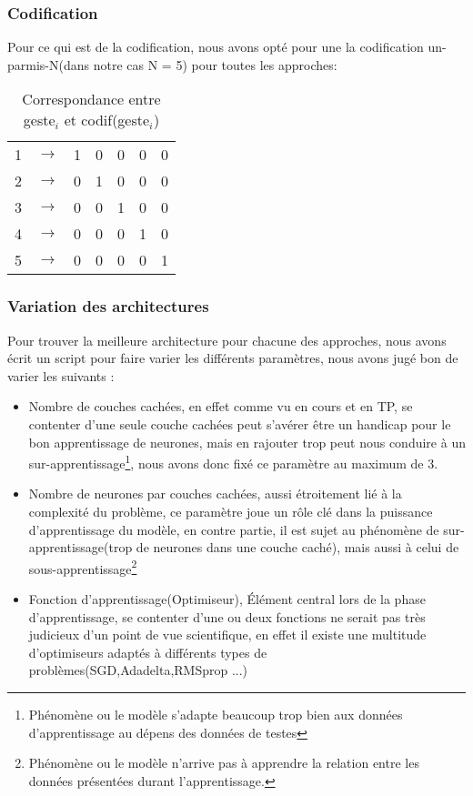 \subsubsection{Codification}
Pour ce qui est de la codification, nous avons opté pour une la codification un-parmis-N(dans notre cas N = 5) pour toutes les approches:\\
\begin{table}[H]
	\centering
	\begin{tabular}{|c|l|c|c|c|c|c|}
		\cline{1-1} \cline{3-7}
		1 & $\rightarrow$ & 1 & 0 & 0 & 0 & 0 \\ \cline{1-1} \cline{3-7} 
		2 & $\rightarrow$ & 0 & 1 & 0 & 0 & 0 \\ \cline{1-1} \cline{3-7} 
		3 & $\rightarrow$ & 0 & 0 & 1 & 0 & 0 \\ \cline{1-1} \cline{3-7} 
		4 & $\rightarrow$ & 0 & 0 & 0 & 1 & 0 \\ \cline{1-1} \cline{3-7} 
		5 & $\rightarrow$ & 0 & 0 & 0 & 0 & 1 \\ \cline{1-1} \cline{3-7} 
	\end{tabular}
	\caption{Correspondance entre geste$_i$ et codif(geste$_i$)}
	
\end{table}


\subsubsection{Variation des architectures}
Pour trouver la meilleure architecture pour chacune des approches, nous avons écrit un script pour faire varier les différents paramètres, nous avons jugé bon de varier les suivants : 
\begin{itemize}
	\item Nombre de couches cachées, en effet comme vu en cours et en TP, se contenter d'une seule couche cachées peut s'avérer être un handicap pour le bon apprentissage de neurones, mais en rajouter trop peut nous conduire à un sur-apprentissage\footnote{Phénomène ou le modèle s'adapte beaucoup trop bien aux données d'apprentissage au dépens des données de testes}, nous avons donc fixé ce paramètre au maximum de 3.
	
	\item Nombre de neurones par couches cachées, aussi étroitement lié à la complexité du problème, ce paramètre joue un rôle clé dans la puissance d'apprentissage du modèle, en contre partie, il est sujet au phénomène de sur-apprentissage(trop de neurones dans une couche caché), mais aussi à celui de sous-apprentissage\footnote{Phénomène ou le modèle n'arrive pas à apprendre la relation entre les données présentées durant l'apprentissage.}
	
	\item Fonction d'apprentissage(Optimiseur), Élément central lors de la phase d'apprentissage, se contenter d'une ou deux fonctions ne serait pas très judicieux d'un point de vue scientifique, en effet il existe une multitude d'optimiseurs adaptés à différents types de problèmes(SGD\cite{Bottou2010},Adadelta\cite{adapt},RMSprop\cite{rms} ...)
\end{itemize}


